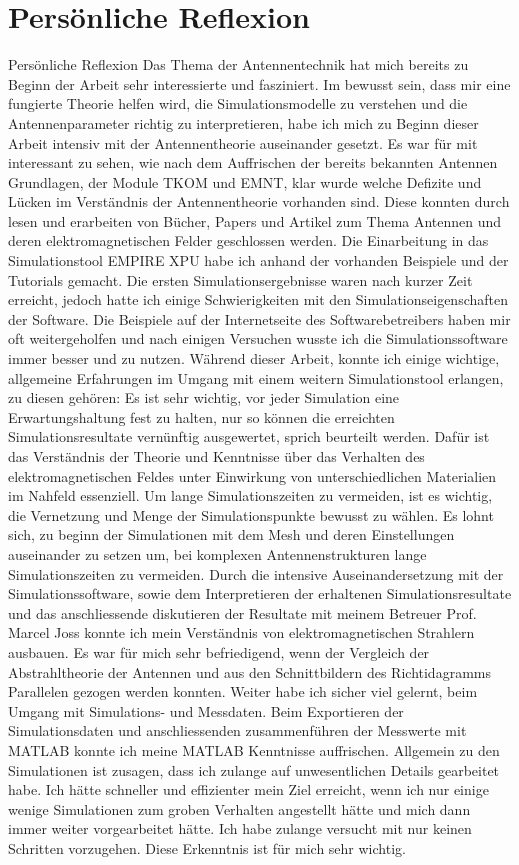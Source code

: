 \section{Persönliche Reflexion}
Persönliche Reflexion
Das Thema der Antennentechnik hat mich bereits zu Beginn der Arbeit sehr interessierte und fasziniert. Im bewusst sein, dass mir eine fungierte Theorie helfen wird, die Simulationsmodelle zu verstehen und die Antennenparameter richtig zu interpretieren, habe ich mich zu Beginn dieser Arbeit intensiv mit der Antennentheorie auseinander gesetzt. Es war für mit interessant zu sehen, wie nach dem Auffrischen der bereits bekannten Antennen Grundlagen, der Module TKOM und EMNT, klar wurde welche Defizite und Lücken im Verständnis der Antennentheorie vorhanden sind. Diese konnten durch lesen und erarbeiten von Bücher, Papers und Artikel zum Thema Antennen und deren elektromagnetischen Felder geschlossen werden. 
Die Einarbeitung in das Simulationstool EMPIRE XPU habe ich anhand der vorhanden Beispiele und der Tutorials gemacht. Die ersten Simulationsergebnisse waren nach kurzer Zeit erreicht, jedoch hatte ich einige Schwierigkeiten mit den Simulationseigenschaften der Software. Die Beispiele auf der Internetseite des Softwarebetreibers haben mir oft weitergeholfen und nach einigen Versuchen wusste ich die Simulationssoftware immer besser und zu nutzen. Während dieser Arbeit, konnte ich einige wichtige, allgemeine Erfahrungen im Umgang mit einem weitern Simulationstool erlangen, zu diesen gehören: Es ist sehr wichtig, vor jeder Simulation eine Erwartungshaltung fest zu halten, nur so können die erreichten Simulationsresultate vernünftig ausgewertet, sprich beurteilt werden. Dafür ist das Verständnis der Theorie und Kenntnisse über das Verhalten des elektromagnetischen Feldes unter Einwirkung von unterschiedlichen Materialien im Nahfeld essenziell. Um lange Simulationszeiten zu vermeiden, ist es wichtig, die Vernetzung und Menge der Simulationspunkte bewusst zu wählen. Es lohnt sich, zu beginn der Simulationen mit dem Mesh und deren Einstellungen auseinander zu setzen um, bei komplexen Antennenstrukturen lange Simulationszeiten zu vermeiden. Durch die intensive Auseinandersetzung mit der Simulationssoftware, sowie dem Interpretieren der erhaltenen  Simulationsresultate und das anschliessende diskutieren der Resultate mit meinem Betreuer Prof. Marcel Joss konnte ich mein Verständnis von elektromagnetischen Strahlern ausbauen. Es war für mich sehr befriedigend,  wenn der Vergleich der Abstrahltheorie der Antennen und aus den Schnittbildern des Richtidagramms Parallelen gezogen werden konnten. Weiter habe ich sicher viel gelernt, beim Umgang mit Simulations- und Messdaten. Beim Exportieren der Simulationsdaten und anschliessenden zusammenführen der Messwerte mit MATLAB konnte ich meine MATLAB Kenntnisse auffrischen. Allgemein zu den Simulationen ist zusagen, dass ich zulange auf unwesentlichen Details gearbeitet habe. Ich hätte schneller und effizienter mein Ziel erreicht, wenn ich nur einige wenige Simulationen zum groben Verhalten angestellt hätte und mich dann immer weiter vorgearbeitet hätte. Ich habe zulange versucht mit nur keinen Schritten vorzugehen. Diese Erkenntnis ist für mich sehr wichtig.
